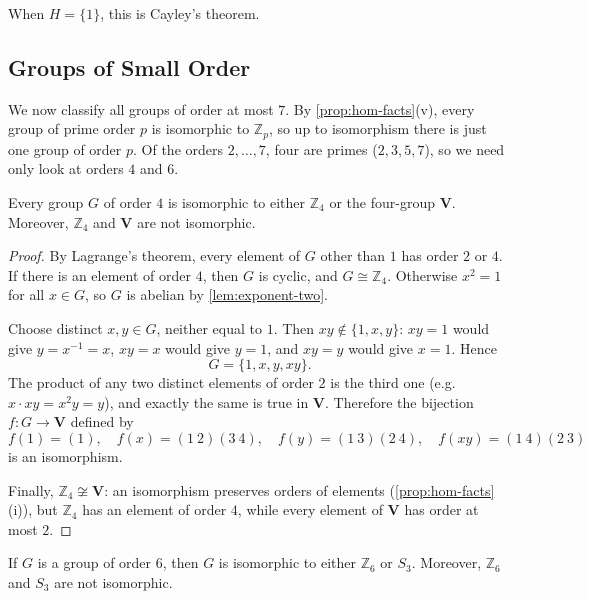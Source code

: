 When \(H = \{1\}\), this is Cayley's theorem.

\subsection{Groups of Small Order}

We now classify all groups of order at most \(7\). By
\autoref{prop:hom-facts}(v), every group of prime order \(p\) is isomorphic to
\(\mathbb Z_p\), so up to isomorphism there is just one group of order \(p\). Of the
orders \(2, \dots, 7\), four are primes (\(2, 3, 5, 7\)), so we need only look at orders
\(4\) and \(6\).

\begin{proposition}\label{prop:order-4}
	Every group \(G\) of order \(4\) is isomorphic to either \(\mathbb Z_4\) or the
	four-group \(\mathbf V\). Moreover, \(\mathbb Z_4\) and \(\mathbf V\) are not
	isomorphic.
\end{proposition}

\begin{proof}
	By Lagrange's theorem, every element of \(G\) other than \(1\) has order \(2\) or
	\(4\). If there is an element of order \(4\), then \(G\) is cyclic, and
	\(G \cong \mathbb Z_4\). Otherwise \(x^2 = 1\) for all \(x \in G\), so \(G\) is abelian
	by \autoref{lem:exponent-two}.

	Choose distinct \(x, y \in G\), neither equal to \(1\). Then
	\(xy \notin \{1, x, y\}\): \(xy = 1\) would give \(y = x^{-1} = x\), \(xy = x\) would
	give \(y = 1\), and \(xy = y\) would give \(x = 1\). Hence
	\[
		G = \{1, x, y, xy\}.
	\]
	The product of any two distinct elements of order \(2\) is the third one (e.g.\
	\(x \cdot xy = x^2y = y\)), and exactly the same is true in \(\mathbf V\). Therefore the
	bijection \(f\colon G \to \mathbf V\) defined by
	\[
		f(1) = (1), \quad f(x) = (1\ 2)(3\ 4), \quad f(y) = (1\ 3)(2\ 4), \quad
		f(xy) = (1\ 4)(2\ 3)
	\]
	is an isomorphism.

	Finally, \(\mathbb Z_4 \not\cong \mathbf V\): an isomorphism preserves orders of
	elements (\autoref{prop:hom-facts}(i)), but \(\mathbb Z_4\) has an element of order
	\(4\), while every element of \(\mathbf V\) has order at most \(2\).
\end{proof}

\begin{proposition}\label{prop:order-6}
	If \(G\) is a group of order \(6\), then \(G\) is isomorphic to either \(\mathbb Z_6\)
	or \(S_3\). Moreover, \(\mathbb Z_6\) and \(S_3\) are not isomorphic.
\end{proposition}


